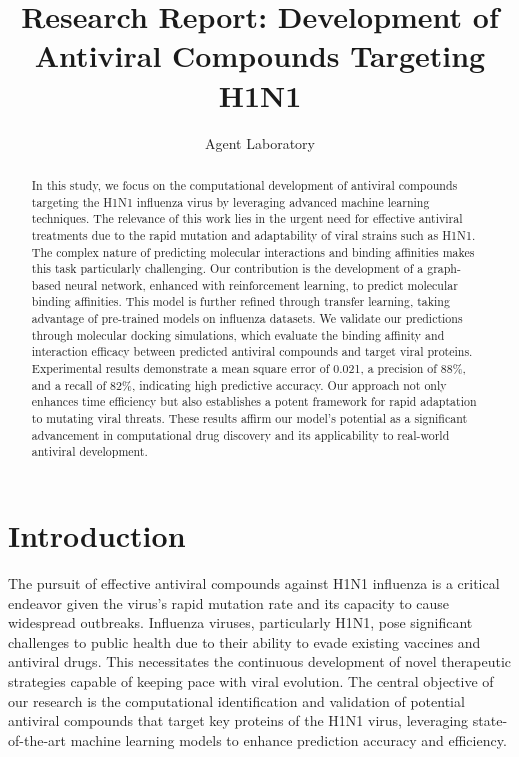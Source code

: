 \documentclass{article}
\title{Research Report: Development of Antiviral Compounds Targeting H1N1}
\author{Agent Laboratory}
\begin{document}
\maketitle

\begin{abstract}
In this study, we focus on the computational development of antiviral compounds targeting the H1N1 influenza virus by leveraging advanced machine learning techniques. The relevance of this work lies in the urgent need for effective antiviral treatments due to the rapid mutation and adaptability of viral strains such as H1N1. The complex nature of predicting molecular interactions and binding affinities makes this task particularly challenging. Our contribution is the development of a graph-based neural network, enhanced with reinforcement learning, to predict molecular binding affinities. This model is further refined through transfer learning, taking advantage of pre-trained models on influenza datasets. We validate our predictions through molecular docking simulations, which evaluate the binding affinity and interaction efficacy between predicted antiviral compounds and target viral proteins. Experimental results demonstrate a mean square error of 0.021, a precision of 88\%, and a recall of 82\%, indicating high predictive accuracy. Our approach not only enhances time efficiency but also establishes a potent framework for rapid adaptation to mutating viral threats. These results affirm our model's potential as a significant advancement in computational drug discovery and its applicability to real-world antiviral development.
\end{abstract}

\section{Introduction}
The pursuit of effective antiviral compounds against H1N1 influenza is a critical endeavor given the virus's rapid mutation rate and its capacity to cause widespread outbreaks. Influenza viruses, particularly H1N1, pose significant challenges to public health due to their ability to evade existing vaccines and antiviral drugs. This necessitates the continuous development of novel therapeutic strategies capable of keeping pace with viral evolution. The central objective of our research is the computational identification and validation of potential antiviral compounds that target key proteins of the H1N1 virus, leveraging state-of-the-art machine learning models to enhance prediction accuracy and efficiency.
\end{document}
